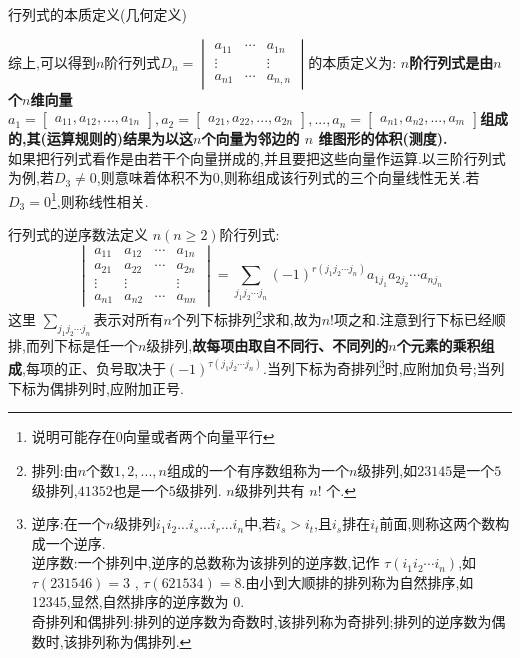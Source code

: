 \documentclass[8pt a4paper, oneside, UTF8]{ctexbook}
\begin{document}
\begin{sloppypar}
\begin{defn}{行列式的本质定义(几何定义)}{}
\begin{center}
        \end{center}
        综上,可以得到$n$阶行列式$D_n=
            \begin{vmatrix}
                a_{11} & \cdots & a_{1n}  \\
                \vdots &        & \vdots  \\
                a_{n1} & \cdots & a_{n,n}
            \end{vmatrix}$的本质定义为:
        \textbf{$n$阶行列式是由$n$个$n$维向量$a_1=\begin{bmatrix}a_{11},a_{12},...,a_{1n}\end{bmatrix},a_2=\begin{bmatrix}a_{21},a_{22},...,a_{2n}\end{bmatrix},...,a_n=\begin{bmatrix}a_{n1},a_{n2},...,a_m\end{bmatrix}$组成的,其(运算规则的)结果为以这$n$个向量为邻边的 $n$ 维图形的体积(测度).}\\
        如果把行列式看作是由若干个向量拼成的,并且要把这些向量作运算.以三阶行列式为例,若$D_3 \neq 0$,则意味着体积不为0,则称组成该行列式的三个向量线性无关.若$D_3 =0$\footnote{说明可能存在0向量或者两个向量平行},则称线性相关.
    \end{defn}
    \begin{defn}{行列式的逆序数法定义}{}
        $n(n\geqslant2)$阶行列式:$$\begin{vmatrix}a_{11}&a_{12}&\cdots&a_{1n}\\a_{21}&a_{22}&\cdots&a_{2n}\\\vdots&\vdots&&\vdots\\a_{n1}&a_{n2}&\cdots&a_{nn}\end{vmatrix}=\sum_{j_{1}j_{2}\cdots j_{n}}(-1)^{r(j_{1}j_{2}\cdots j_{n})}a_{1j_{1}}a_{2j_{2}}\cdots a_{nj_{n}}$$
        这里 $\sum_{j_1j_2\cdots j_n} $表示对所有$n$个列下标排列\footnote{排列:由$n$个数$1,2,...,n$组成的一个有序数组称为一个$n$级排列,如$23145$是一个$5$级排列,$41352$也是一个$5$级排列. $n$级排列共有 $n!$ 个.}求和,故为$n!$项之和.注意到行下标已经顺排,而列下标是任一个$n$级排列,\textbf{故每项由取自不同行、不同列的$n$个元素的乘积组成},每项的正、负号取决于$(-1)^{\tau(j_1j_2\cdots j_n)}$.当列下标为奇排列\footnote{逆序:在一个$n$级排列$i_1i_2...i_s...i_r...i_n$中,若$i_s>i_t$,且$i_{s}$排在$i_{t}$前面,则称这两个数构成一个逆序.\\逆序数:一个排列中,逆序的总数称为该排列的逆序数,记作 $\tau(i_1i_2\cdots i_n)$,如 $\tau(231546)=3$ , $\tau(621534)=8$.由小到大顺排的排列称为自然排序,如 12345,显然,自然排序的逆序数为 0.\\奇排列和偶排列:排列的逆序数为奇数时,该排列称为奇排列;排列的逆序数为偶数时,该排列称为偶排列.}时,应附加负号;当列下标为偶排列时,应附加正号.

\end{defn}
\end{sloppypar}
\end{document}
